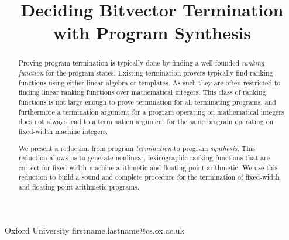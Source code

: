 \documentclass[preprint]{sigplanconf}
\theoremstyle{definition}
\begin{document}
\setlength{\pdfpageheight}{\paperheight}
\setlength{\pdfpagewidth}{\paperwidth}





\title{Deciding Bitvector Termination with Program Synthesis}

           {Oxford University}
           {firstname.lastname@cs.ox.ac.uk}

\maketitle

\begin{abstract}
Proving program termination is typically done by finding a well-founded \emph{ranking function}
for the program states.
Existing termination provers typically find ranking functions
using either linear algebra or templates.  As such they are often restricted to
finding linear ranking functions over mathematical integers.  This class
of ranking functions is not large enough to prove termination for all terminating
programs, and furthermore a termination argument for a program operating on mathematical integers
does not always lead to a termination argument for the same program operating on
fixed-width machine integers.

We present a reduction from program \emph{termination} to program \emph{synthesis}.
This reduction allows us to generate nonlinear, lexicographic ranking functions that
are correct for fixed-width machine arithmetic and floating-point arithmetic.
We use this reduction to build a sound and complete procedure for the termination
of fixed-width and floating-point arithmetic programs.
\end{abstract}

\end{document}
